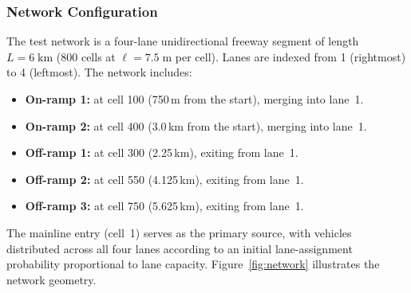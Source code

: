 \documentclass[review,authoryear]{elsarticle}
\begin{document}
\subsubsection{Network Configuration}

The test network is a four-lane unidirectional freeway segment of length $L = 6\;\text{km}$ (800 cells at $\ell = 7.5\;\text{m}$ per cell). Lanes are indexed from 1 (rightmost) to 4 (leftmost). The network includes:
\begin{itemize}
    \item \textbf{On-ramp 1:} at cell 100 (750\,m from the start), merging into lane~1.
    \item \textbf{On-ramp 2:} at cell 400 (3.0\,km from the start), merging into lane~1.
    \item \textbf{Off-ramp 1:} at cell 300 (2.25\,km), exiting from lane~1.
    \item \textbf{Off-ramp 2:} at cell 550 (4.125\,km), exiting from lane~1.
    \item \textbf{Off-ramp 3:} at cell 750 (5.625\,km), exiting from lane~1.
\end{itemize}

The mainline entry (cell~1) serves as the primary source, with vehicles distributed across all four lanes according to an initial lane-assignment probability proportional to lane capacity. Figure~\ref{fig:network} illustrates the network geometry.
\end{document}
